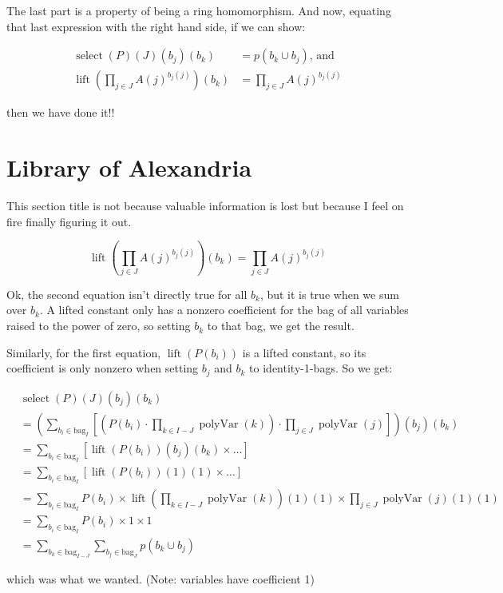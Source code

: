 \documentclass[]{article}
\DeclareMathOperator{\select}{select}
\DeclareMathOperator{\polyVar}{polyVar}
\DeclareMathOperator{\lift}{lift}
\newcommand{\bag}[1]{\mathrm{bag}_{#1}}
\begin{document}
The last part is a property of being a ring homomorphism. And now, equating that last expression with the right hand side, if we can show:

\begin{align*}
  \select(P)(J)(b_j)(b_k) &= p(b_k \cup b_j) \text{, and}\\
  \lift\left(\prod_{j \in J}A(j)^{b_j(j)}\right)(b_k) &= \prod_{j \in J}{A(j)^{b_j(j)}}
\end{align*}

then we have done it!!

\section{Library of Alexandria}

This section title is not because valuable information is lost but because I feel on fire finally figuring it out.

\[ \lift\left(\prod_{j \in J}A(j)^{b_j(j)}\right)(b_k) = \prod_{j \in J}{A(j)^{b_j(j)}} \]

Ok, the second equation isn't directly true for all $b_k$, but it is true when we sum over $b_k$. A lifted constant only has a nonzero coefficient for the bag of all variables raised to the power of zero, so setting $b_k$ to that bag, we get the result.

Similarly, for the first equation, $\lift(P(b_i))$ is a lifted constant, so its coefficient is only nonzero when setting $b_j$ and $b_k$ to identity-1-bags. So we get:

\begin{align*}
     &\select(P)(J)(b_j)(b_k)
  \\ &= \left(\sum_{b_i \in \bag{I}} \left[\left(P(b_i) \cdot
           \prod_{k \in I-J}\polyVar(k)\right) \cdot
           \prod_{j \in J}\polyVar(j)\right]\right)(b_j)(b_k)
  \\ &= \sum_{b_i \in \bag{I}} \left[\lift(P(b_i))(b_j)(b_k) \times \dots \right]
  \\ &= \sum_{b_i \in \bag{I}} \left[\lift(P(b_i))(1)(1) \times \dots \right]
  \\ &= \sum_{b_i \in \bag{I}} P(b_i) \times
           \lift\left(\prod_{k \in I-J}\polyVar(k)\right)(1)(1) \times
           \prod_{j \in J}\polyVar(j)(1)(1)
   \\&= \sum_{b_i \in \bag{I}} P(b_i) \times 1 \times 1
   \\&= \sum_{b_k \in \bag{I-J}} \sum_{b_j \in \bag{J}} p(b_k \cup b_j)
\end{align*}

which was what we wanted. (Note: variables have coefficient 1)
\end{document}
